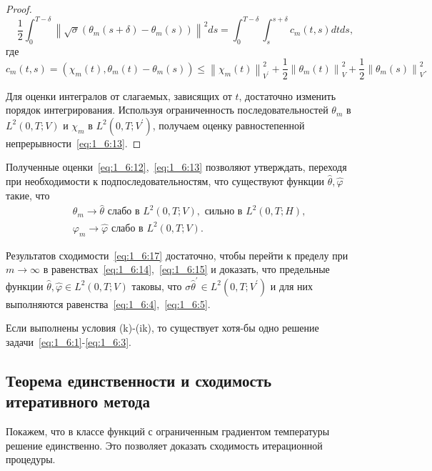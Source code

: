 \begin{proof}
    \[
        \frac{1}{2} \int_{0}^{T-\delta}\left\|\sqrt{\sigma}\left(\theta_{m}(s+\delta)
        -\theta_{m}(s)\right)\right\|^{2} d s
        =\int_{0}^{T-\delta} \int_{s}^{s+\delta} c_{m}(t, s) d t d s,
    \]
    где
    \[
        c_{m}(t, s)=\left(\chi_{m}(t), \theta_{m}(t)-\theta_{m}(s)\right)
        \leq\left\|\chi_{m}(t)\right\|_{V^{\prime}}^{2}
        +\frac{1}{2}\left\|\theta_{m}(t)\right\|_{V}^{2}
        +\frac{1}{2}\left\|\theta_{m}(s)\right\|_{V}^{2}.
    \]


    Для оценки интегралов от слагаемых, зависящих от $t$,
    достаточно изменить порядок интегрирования.
    Используя ограниченность последовательностей $\theta_{m}$ в $L^{2}(0, T ; V)$
    и $\chi_{m}$ в $L^{2}\left(0, T ; V^{\prime}\right)$,
    получаем оценку равностепенной непрерывности~\eqref{eq:1_6:13}.
\end{proof}

Полученные оценки~\eqref{eq:1_6:12},~\eqref{eq:1_6:13} позволяют утверждать,
переходя при необходимости к подпоследовательностям,
что существуют функции $\widehat{\theta}, \widehat{\varphi}$ такие, что
\begin{equation}
    \label{eq:1_6:17}
    \begin{aligned}
        & \theta_{m} \rightarrow \widehat{\theta} \text { слабо в } L^{2}(0, T ; V),
        \text { сильно в } L^{2}(0, T ; H), \\
        & \varphi_{m} \rightarrow \widehat{\varphi} \text { слабо в } L^{2}(0, T ; V).
    \end{aligned}
\end{equation}

Результатов сходимости~\eqref{eq:1_6:17} достаточно, чтобы перейти к пределу
при $m \rightarrow \infty$ в равенствах~\eqref{eq:1_6:14},~\eqref{eq:1_6:15} и доказать,
что предельные функции $\widehat{\theta}, \widehat{\varphi} \in L^{2}(0, T ; V)$
таковы, что $\sigma \widehat{\theta}^{\prime} \in L^{2}\left(0, T ; V^{\prime} \right)$
и для них выполняются равенства~\eqref{eq:1_6:4},~\eqref{eq:1_6:5}.

\begin{theorem}
    \label{th:1_6:1}
    Если выполнены условия (k)-(ik), то существует хотя-бы одно
    решение задачи~\eqref{eq:1_6:1}-\eqref{eq:1_6:3}.
\end{theorem}

\subsection{Теорема единственности и сходимость итеративного метода}
\label{subsec:ch1/sec5/subsec3}
Покажем, что в классе функций с ограниченным градиентом температуры решение единственно.
Это позволяет доказать сходимость итерационной процедуры.


